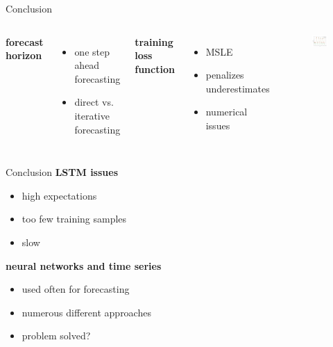 \documentclass{beamer}
\begin{document}
  
  \begin{frame}{Conclusion}  
    \begin{columns}[c]
      \textbf{forecast horizon}
      \begin{itemize}
       \item one step ahead forecasting
       \item direct vs. iterative forecasting
      \end{itemize}
      
      \hspace{10pt}
      
      \textbf{training loss function}
      \begin{itemize}
       \item MSLE 
       \item penalizes underestimates
       \item numerical issues
      \end{itemize}

        \begin{figure}
         \includegraphics[width=1.0\textwidth]{images/msle_standardized_data_issue.png}
        \end{figure}
    \end{columns}
  \end{frame}
  
  
  \begin{frame}{Conclusion}
    \textbf{LSTM issues}
    \begin{itemize}
     \item high expectations
     \item too few training samples
     \item slow
    \end{itemize}
    
    \textbf{neural networks and time series}
    \begin{itemize}
     \item used often for forecasting
     \item numerous different approaches
     \item problem solved?
    \end{itemize}
  \end{frame}
\end{document}
